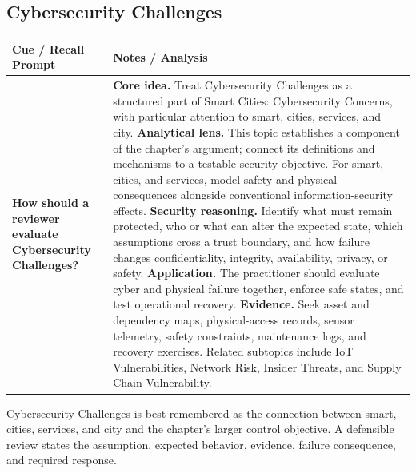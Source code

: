 \documentclass[11pt]{article}
\newcommand{\CornellHeader}{%
\rowcolor{Navy}\color{white}\bfseries Cue / Recall Prompt & \color{white}\bfseries Notes / Analysis\\\hline}
\newcommand{\CornellRow}[2]{%
\cellcolor{CueGray}\RaggedRight\textbf{#1} & \RaggedRight #2\\\hline}
\begin{document}
\subsection*{Cybersecurity Challenges}
\begin{longtable}{>{\RaggedRight\arraybackslash}p{}|>{\RaggedRight\arraybackslash}p{}}
\CornellHeader
\CornellRow{How should a reviewer evaluate Cybersecurity Challenges?}{\textbf{Core idea.} Treat Cybersecurity Challenges as a structured part of Smart Cities: Cybersecurity Concerns, with particular attention to smart, cities, services, and city. \textbf{Analytical lens.} This topic establishes a component of the chapter's argument; connect its definitions and mechanisms to a testable security objective. For smart, cities, and services, model safety and physical consequences alongside conventional information-security effects. \textbf{Security reasoning.} Identify what must remain protected, who or what can alter the expected state, which assumptions cross a trust boundary, and how failure changes confidentiality, integrity, availability, privacy, or safety. \textbf{Application.} The practitioner should evaluate cyber and physical failure together, enforce safe states, and test operational recovery. \textbf{Evidence.} Seek asset and dependency maps, physical-access records, sensor telemetry, safety constraints, maintenance logs, and recovery exercises. Related subtopics include IoT Vulnerabilities, Network Risk, Insider Threats, and Supply Chain Vulnerability.}
\end{longtable}
\begin{topicsummary}
Cybersecurity Challenges is best remembered as the connection between smart, cities, services, and city and the chapter's larger control objective. A defensible review states the assumption, expected behavior, evidence, failure consequence, and required response.
\end{topicsummary}
\end{document}
